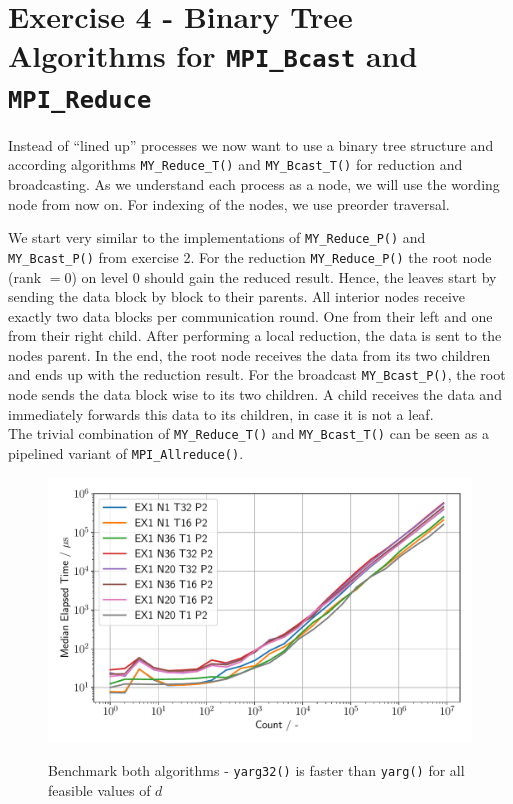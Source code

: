 \section{Exercise 4 - Binary Tree Algorithms for \texttt{MPI\_Bcast} and \texttt{MPI\_Reduce}}
Instead of “lined up” processes we now want to use a binary tree structure and according algorithms 
\texttt{MY\_Reduce\_T()} and \texttt{MY\_Bcast\_T()} for reduction and broadcasting. As we understand 
each process as a node, we will use the wording node from now on. For indexing of the nodes, we use preorder traversal.

We start very similar to the implementations of \texttt{MY\_Reduce\_P()} and \texttt{MY\_Bcast\_P()} 
from exercise 2. For the reduction \texttt{MY\_Reduce\_P()}  the root node (rank $=0$) on level 0 should 
gain the reduced result. Hence, the leaves start by sending the data block by block to their parents. All 
interior nodes receive exactly two data blocks per communication round. One from their left and one from their 
right child. After performing a local reduction, the data is sent to the nodes parent. In the end, the root 
node receives the data from its two children and ends up with the reduction result. For the broadcast 
\texttt{MY\_Bcast\_P()}, the root node sends the data block wise to its two children. A child receives 
the data and immediately forwards this data to its children, in case it is not a leaf.\\

The trivial combination of \texttt{MY\_Reduce\_T()} and \texttt{MY\_Bcast\_T()} can be seen 
as a pipelined variant of \texttt{MPI\_Allreduce()}.\\

\begin{figure}[h]
    \begin{center}
        \includegraphics[width= 0.88\linewidth]{figures/Ex1_2.pdf} 
        \label{ref_plot_task_5}
        \caption{Benchmark both algorithms - \texttt{yarg32()} is faster than \texttt{yarg()} for all feasible values of $d$}
    \end{center}
\end{figure}
\pagebreak

